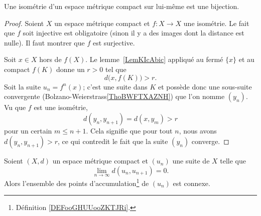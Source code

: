 \begin{proposition}
	Une isométrie d'un espace métrique compact sur lui-même est une bijection.
\end{proposition}

\begin{proof}
	Soient \( X\) un espace métrique compact et \( f\colon X\to X\) une isométrie. Le fait que \( f\) soit injective est obligatoire (sinon il y a des images dont la distance est nulle). Il faut montrer que \( f\) est surjective.

	Soit \( x\in X\) hors de \( f(X)\). Le lemme~\ref{LemKIcAbic} appliqué au fermé \( \{ x \}\) et au compact \( f(K)\) donne un \( r>0\) tel que
	\begin{equation}
		d\big( x,f(K)\big)>r.
	\end{equation}
	Soit la suite \( u_n=f^n(x)\); c'est une suite dans \( K\) et possède donc une sous-suite convergente (Bolzano-Weierstrass\ref{ThoBWFTXAZNH}) que l'on nomme \( (y_n)\). Vu que \( f\) est une isométrie,
	\begin{equation}
		d(y_{n},y_{n+1})=d(x,y_m)>r
	\end{equation}
	pour un certain \( m\leq n+1\). Cela signifie que pour tout \( n\), nous avons \( d(y_n,y_{n+1})>r\), ce qui contredit le fait que la suite \( (y_n)\) converge.
\end{proof}

\begin{proposition} \label{PropLHWACDU}
	Soient \( (X,d)\) un espace métrique compact et \( (u_n)\) une suite de \( X\) telle que
	\begin{equation}
		\lim_{n\to \infty} d(u_n,u_{n+1})=0.
	\end{equation}
	Alors l'ensemble des points d'accumulation\footnote{Définition \ref{DEFooGHUUooZKTJRi}.} de \( (u_n)\) est connexe.
\end{proposition}

